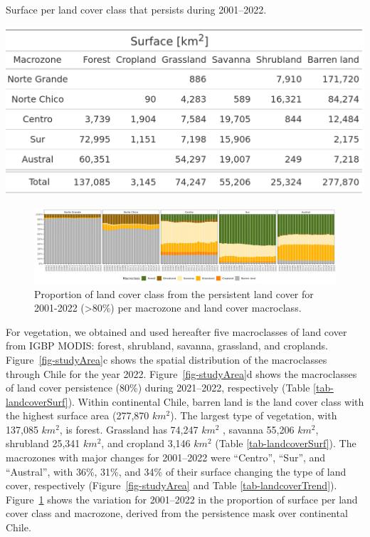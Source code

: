 \documentclass[
  authoryear,
  preprint,
  3p,
  onecolumn]{elsarticle}
\begin{document}
\begin{table}[!ht]
\caption{Surface per land cover class that persists during 2001–2022.}
\label{tab-landcoverSurf}
\includegraphics[width = .5\textwidth]{../output/figs/table_surface_landcover_macrozone.png}
\end{table}

\begin{figure}[!ht]

{\centering \includegraphics{../output/figs/proportion_landcover_macroclass_2001-2022.png}

}

\caption{\label{fig-LCprop}Proportion of land cover class from the
persistent land cover for 2001-2022 (\textgreater80\%) per macrozone and
land cover macroclass.}

\end{figure}

For vegetation, we obtained and used hereafter five macroclasses of land
cover from IGBP MODIS: forest, shrubland, savanna, grassland, and
croplands. Figure~\ref{fig-studyArea}c shows the spatial distribution of
the macroclasses through Chile for the year 2022.
Figure~\ref{fig-studyArea}d shows the macroclasses of land cover
persistence (80\%) during 2021--2022, respectively (Table
\ref{tab-landcoverSurf}). Within continental Chile, barren land is the
land cover class with the highest surface area (277,870 \(km^2\)). The
largest type of vegetation, with 137,085 \(km^2\), is forest. Grassland
has 74,247 \(km^2\) , savanna 55,206 \(km^2\), shrubland 25,341
\(km^2\), and cropland 3,146 \(km^2\) (Table \ref{tab-landcoverSurf}).
The macrozones with major changes for 2001--2022 were ``Centro'',
``Sur'', and ``Austral'', with 36\%, 31\%, and 34\% of their surface
changing the type of land cover, respectively
(Figure~\ref{fig-studyArea} and Table \ref{tab-landcoverTrend}).
Figure~\ref{fig-LCprop} shows the variation for 2001--2022 in the
proportion of surface per land cover class and macrozone, derived from
the persistence mask over continental Chile.
\end{document}
